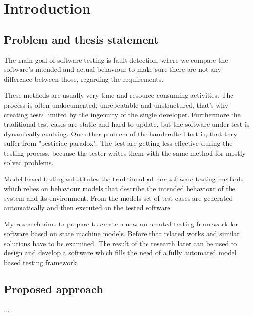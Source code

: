 \chapter{Introduction}
\label{cha:introduction}

\section{Problem and thesis statement}
\label{sec:problem}

The main goal of software testing is fault detection, where we compare the software's intended and actual behaviour to make sure there are not any difference between those, regarding the requirements.

These methods are usually very time and resource consuming activities. The process is often undocumented, unrepeatable and unstructured, that's why creating tests limited by the ingenuity of the single developer. Furthermore the traditional test cases are static and hard to update, but the software under test is dynamically evolving. One other problem of the handcrafted test is, that they suffer from "pesticide paradox". The test are getting less effective during the testing process, because the tester writes them with the same method for mostly solved problems.

Model-based testing substitutes the traditional ad-hoc software testing methods which relies on behaviour models that describe the intended behaviour of the system and its environment. From the models set of test cases are generated automatically and then executed on the tested software.

My research aims to prepare to create a new automated testing framework for software based on state machine models. Before that related works and similar solutions have to be examined. The result of the research later can be used to design and develop a software which fills the need of a fully automated model based testing framework.


\section{Proposed approach}
\label{sec:proposedapproach}

...


